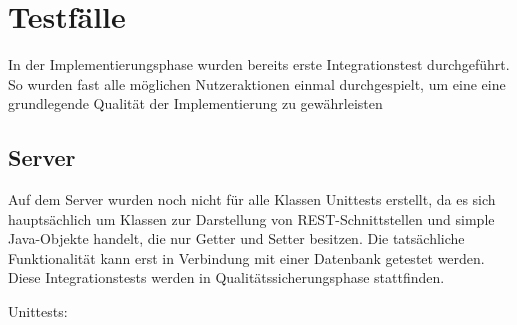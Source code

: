 \section{Testfälle}
In der Implementierungsphase wurden bereits erste Integrationstest durchgeführt. So wurden fast alle möglichen Nutzeraktionen einmal durchgespielt, um eine eine grundlegende Qualität der Implementierung zu gewährleisten
\subsection{Server}
Auf dem Server wurden noch nicht für alle Klassen Unittests erstellt, da es sich hauptsächlich um Klassen zur Darstellung von REST-Schnittstellen und simple Java-Objekte handelt, die nur Getter und Setter besitzen. Die tatsächliche Funktionalität kann erst in Verbindung mit einer Datenbank getestet werden. Diese Integrationstests werden in Qualitätssicherungsphase stattfinden.


Unittests:

